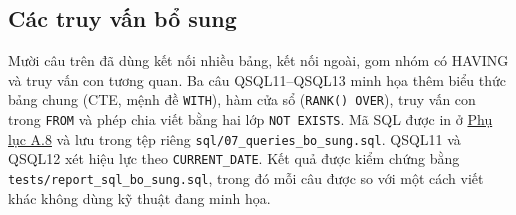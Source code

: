 \noindent\begin{minipage}{\linewidth}
\subsection*{Các truy vấn bổ sung}

Mười câu trên đã dùng kết nối nhiều bảng, kết nối ngoài, gom nhóm có HAVING và truy vấn con tương quan. Ba câu QSQL11--QSQL13 minh họa thêm biểu thức bảng chung (CTE, mệnh đề \texttt{WITH}), hàm cửa sổ (\texttt{RANK() OVER}), truy vấn con trong \texttt{FROM} và phép chia viết bằng hai lớp \texttt{NOT EXISTS}. Mã SQL được in ở \hyperref[sec:qsql-bo-sung]{Phụ lục A.8} và lưu trong tệp riêng \texttt{sql/07\_queries\_bo\_sung.sql}. QSQL11 và QSQL12 xét hiệu lực theo \texttt{CURRENT\_DATE}. Kết quả được kiểm chứng bằng \texttt{tests/report\_sql\_bo\_sung.sql}, trong đó mỗi câu được so với một cách viết khác không dùng kỹ thuật đang minh họa.
\end{minipage}\par\medskip

